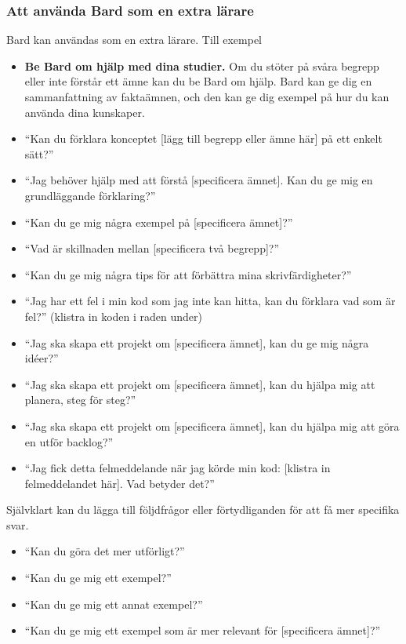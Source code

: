 \hypertarget{att-anvuxe4nda-bard-som-en-extra-luxe4rare}{%
\subsubsection{Att använda Bard som en extra
lärare}\label{att-anvuxe4nda-bard-som-en-extra-luxe4rare}}

Bard kan användas som en extra lärare. Till exempel

\begin{itemize}
\item
  \textbf{Be Bard om hjälp med dina studier.} Om du stöter på svåra
  begrepp eller inte förstår ett ämne kan du be Bard om hjälp. Bard kan
  ge dig en sammanfattning av faktaämnen, och den kan ge dig exempel på
  hur du kan använda dina kunskaper.
\item
  ``Kan du förklara konceptet {[}lägg till begrepp eller ämne här{]} på
  ett enkelt sätt?''
\item
  ``Jag behöver hjälp med att förstå {[}specificera ämnet{]}. Kan du ge
  mig en grundläggande förklaring?''
\item
  ``Kan du ge mig några exempel på {[}specificera ämnet{]}?''
\item
  ``Vad är skillnaden mellan {[}specificera två begrepp{]}?''
\item
  ``Kan du ge mig några tips för att förbättra mina skrivfärdigheter?''
\item
  ``Jag har ett fel i min kod som jag inte kan hitta, kan du förklara
  vad som är fel?'' (klistra in koden i raden under)
\item
  ``Jag ska skapa ett projekt om {[}specificera ämnet{]}, kan du ge mig
  några idéer?''
\item
  ``Jag ska skapa ett projekt om {[}specificera ämnet{]}, kan du hjälpa
  mig att planera, steg för steg?''
\item
  ``Jag ska skapa ett projekt om {[}specificera ämnet{]}, kan du hjälpa
  mig att göra en utför backlog?''
\item
  ``Jag fick detta felmeddelande när jag körde min kod: {[}klistra in
  felmeddelandet här{]}. Vad betyder det?''
\end{itemize}

Självklart kan du lägga till följdfrågor eller förtydliganden för att få
mer specifika svar.

\begin{itemize}
\tightlist
\item
  ``Kan du göra det mer utförligt?''
\item
  ``Kan du ge mig ett exempel?''
\item
  ``Kan du ge mig ett annat exempel?''
\item
  ``Kan du ge mig ett exempel som är mer relevant för {[}specificera
  ämnet{]}?''
\end{itemize}

